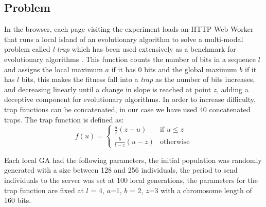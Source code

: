 \documentclass{llncs}
\begin{document}
\subsection{Problem}
In the browser, each page visiting the experiment loads an HTTP Web Worker
that runs a local island of an evolutionary algorithm to solve a
multi-modal problem called {\em l-trap} which has been used extensively
as a benchmark for evolutionary algorithms
\cite{nijssen2003analysis}.
This function counts the number of bits in a sequence $l$ and assigns
the local maximum $a$ if it has 0 bits and the global maximum $b$ if it has $l$
bits, this makes the fitness fall into a {\em trap}
as the number of bits increases, and decreasing linearly until a change in slope
is reached at point $z$, adding a deceptive component for evolutionary
algorithms. In order to increase difficulty, trap functions can be
concatenated, in our case we have used $40$ concatenated traps. The trap
function is defined as:
\[ f(u)=
    \begin{cases}
      \frac{a}{z}(z-u) & \text{if } u\leq z\\
      \frac{b}{l-z} (u-z)& \text{otherwise}
   \end{cases}
 \]


Each local GA had the following parameters, the initial population was randomly
generated with a size between 128 and 256 individuals, the period to send individuals to the server was set at 100 local generations, the parameters for the trap function are fixed at $l$ = 4,
$a$=1, $b$ = 2, $z$=3 with a chromosome length of 160 bits.

\end{document}
